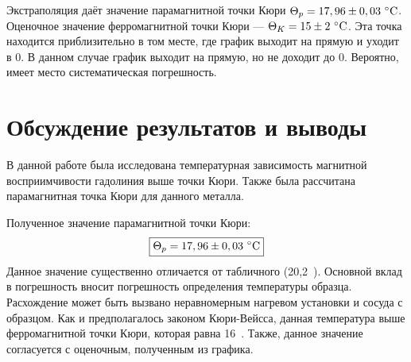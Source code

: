 \documentclass[a4paper, 12pt]{article}
\begin{document}
Экстраполяция даёт значение парамагнитной точки Кюри $\Theta_p = 17,96\pm0,03~\celsius$. Оценочное значение ферромагнитной точки Кюри --- $\Theta_K = 15\pm2~\celsius$. Эта точка находится приблизительно в том месте, где график выходит на прямую и уходит в 0. В данном случае график выходит на прямую, но не доходит до 0. Вероятно, имеет место систематическая погрешность.


\section{Обсуждение результатов и выводы}

В данной работе была исследована температурная зависимость магнитной восприимчивости гадолиния выше точки Кюри. Также была рассчитана парамагнитная точка Кюри для данного металла.

Полученное значение парамагнитной точки Кюри: $$\boxed{\Theta_p = 17,96\pm0,03~\celsius}$$
Данное значение существенно отличается от табличного (20,2~\textcelsius). Основной вклад в погрешность вносит погрешность определения температуры образца. Расхождение может быть вызвано неравномерным нагревом установки и сосуда с образцом. Как и предполагалось законом Кюри-Вейсса, данная температура выше ферромагнитной точки Кюри, которая равна 16~\textcelsius{}. Также, данное значение согласуется с оценочным, полученным из графика.
\end{document}
